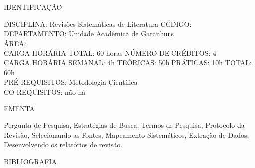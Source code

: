 \documentclass[
	12pt,				%
	openright,			%
  oneside,     %
	a4paper,			%
	chapter=TITLE,		%
	english,			%
	french,				%
	spanish,			%
	brazil				%
	]{abntex2}
\begin{document}
\begin{apendicesenv}
\newpage IDENTIFICAÇÃO

DISCIPLINA: Revisões Sistemáticas de Literatura CÓDIGO: \\
DEPARTAMENTO: Unidade Acadêmica de Garanhuns \\
ÁREA: \\
CARGA HORÁRIA TOTAL: 60 horas NÚMERO DE CRÉDITOS: 4\\
CARGA HORÁRIA SEMANAL: 4h TEÓRICAS: 50h PRÁTICAS: 10h TOTAL: 60h\\
PRÉ-REQUISITOS: Metodologia Científica\\
CO-REQUISITOS: não há

EMENTA 

Pergunta de Pesquisa, Estratégias de Busca, Termos de Pesquisa,
Protocolo da Revisão, Selecionando as Fontes, Mapeamento Sistemáticos,
Extração de Dados, Desenvolvendo os relatórios de revisão.

BIBLIOGRAFIA 


\end{apendicesenv}
\end{document}
